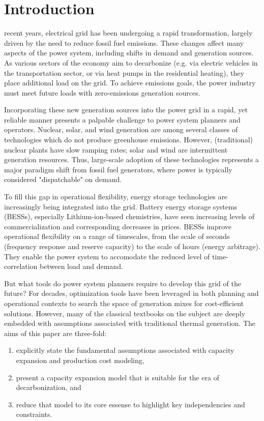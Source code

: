 \documentclass[journal,11pt]{IEEEtran}
\begin{document}

\printnomenclature


\section{Introduction}
 recent years, electrical grid has been undergoing a rapid transformation,
largely driven by the need to reduce fossil fuel emissions. These changes affect many aspects
of the power system, including shifts in demand and generation sources.
As various sectors of the economy aim to decarbonize (e.g. via electric vehicles in the transportation
sector, or via heat pumps in the residential heating), they place additional load on the grid.
To achieve emissions goals, the power industry must meet future loads with zero-emissions generation
sources.

Incorporating these new generation sources into the power grid in a rapid, yet reliable manner presents a palpable challenge
to power system planners and operators. Nuclear, solar, and wind generation are among several classes of technologies
which do not produce greenhouse emissions. However, (traditional) nuclear plants have slow ramping rates; solar and wind
are intermittent generation resources. Thus, large-scale adoption of these technologies represents a major paradigm shift
from fossil fuel generators, where power is typically considered "dispatchable" on demand.

To fill this gap in operational flexibility, energy storage technologies are increasingly being integrated into the grid.
Battery energy storage systems (BESSs), especially Lithium-ion-based chemistries, have seen increasing
levels of commercialization and corresponding decreases in prices. BESSs improve operational flexibility on a range
of timescales, from the scale of seconds (frequency response and reserve capacity) to the scale of hours (energy arbitrage).
They enable the power system to accomodate the reduced level of time-correlation between load and demand.

But what tools do power system planners require to develop this grid of the future? For decades, optimization tools have been
leveraged in both planning and operational contexts to search the space of generation mixes for cost-efficient solutions.
However, many of the classical textbooks on the subject are deeply embedded with assumptions associated with traditional thermal generation.
The aims of this paper are three-fold:
\begin{enumerate}
  \item explicitly state the fundamental assumptions associated with capacity expansion and production cost modeling,
  \item present a capacity expansion model that is suitable for the era of decarbonization, and
  \item reduce that model to its core essense to highlight key independencies and constraints.
\end{enumerate} 
\end{document}
